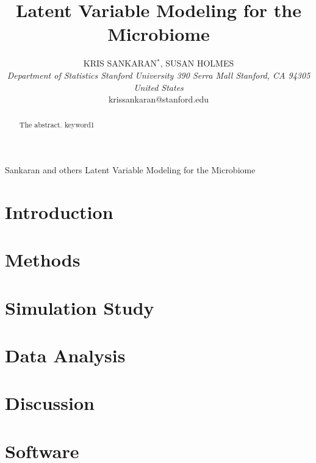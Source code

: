 \documentclass[oupdraft]{bio}
\begin{document}
\title{Latent Variable Modeling for the Microbiome} 

\author{
  KRIS SANKARAN$^\ast$, SUSAN HOLMES\\[4pt]
  \textit{
    Department of Statistics
    Stanford University
    390 Serra Mall
    Stanford, CA 94305
    United States
  } \\[2pt]
  {krissankaran@stanford.edu}
}

\markboth
{Sankaran and others}
{Latent Variable Modeling for the Microbiome}

\maketitle


\begin{abstract}
  {
    The abstract.
  }
  {
    keyword1
  }
\end{abstract}

\section{Introduction}

\section{Methods}

\section{Simulation Study}

\section{Data Analysis}

\section{Discussion}

\section{Software}
\end{document}
